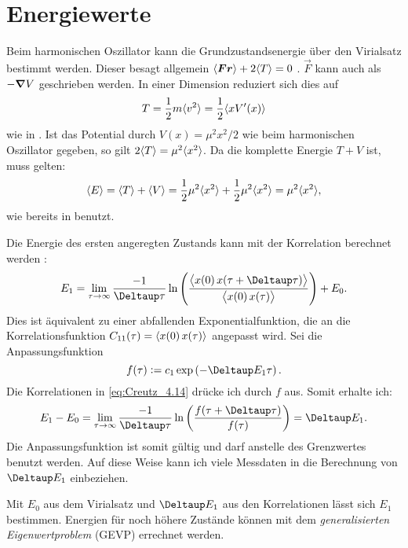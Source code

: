 \chapter{Energiewerte}

Beim harmonischen Oszillator kann die Grundzustandsenergie über den Virialsatz
bestimmt werden. Dieser besagt allgemein $\langle \boldsymbol{F} \boldsymbol{r} \rangle + 2
\langle T \rangle = 0$ \parencite[551]{Kuypers/Mechanik}. $\vec F$ kann auch als $-
\boldsymbol{\nabla} V$ geschrieben werden. In einer Dimension reduziert sich dies auf
\[
    T = \frac12 m \langle v^2 \rangle = \frac12 \langle x V'(x) \rangle
\]
wie in \parencite[(2.29)]{Creutz/Statistical_Approach_QM}.
Ist das Potential durch $V(x) = \mu^2 x^2/2$ wie beim harmonischen Oszillator
gegeben, so gilt $2 \langle T \rangle = \mu^2 \langle x^2 \rangle$. Da die komplette Energie
$T + V$ ist, muss gelten:
\[
    \langle E \rangle = \langle T \rangle + \langle V \rangle
    = \frac12 \mu^2 \langle x^2 \rangle + \frac12 \mu^2 \langle x^2 \rangle
    = \mu^2 \langle x^2 \rangle,
\]
wie bereits in \parencite[(4.13)]{Creutz/Statistical_Approach_QM} benutzt.

Die Energie des ersten angeregten Zustands kann mit der Korrelation
berechnet werden \parencite[(4.14)]{Creutz/Statistical_Approach_QM}:
\begin{equation}
    \label{eq:Creutz_4.14}
    E_1 = \lim_{\tau \to \infty} \frac{-1}{\Deltaup \tau} \ln
    \del{\frac{\Bracket{x(0) \, x(\tau + \Deltaup \tau)}}{\Bracket{x(0) \,
    x(\tau)}}} + E_0.
\end{equation}
Dies ist äquivalent zu einer abfallenden Exponentialfunktion, die an die
Korrelationsfunktion $C_{11}(\tau) = \langle x(0) \, x(\tau) \rangle$ angepasst wird.
Sei die Anpassungsfunktion
\begin{equation}
    \label{eq:fit-function-time-evolution}
    f(\tau) := c_1 \exp\del{-\Deltaup E_1 \tau}.
\end{equation}
Die Korrelationen in \eqref{eq:Creutz_4.14} drücke ich durch $f$ aus. Somit
erhalte ich:
\[
    E_1 - E_0
    = \lim_{\tau \to \infty} \frac{-1}{\Deltaup \tau} \ln
    \del{\frac{f(\tau + \Deltaup \tau)}{f(\tau)}}
    = \Deltaup E_1.
\]
Die Anpassungsfunktion ist somit gültig und darf anstelle des Grenzwertes
benutzt werden. Auf diese Weise kann ich viele Messdaten in die Berechnung von
$\Deltaup E_1$ einbeziehen.

Mit $E_0$ aus dem Virialsatz und $\Deltaup E_1$ aus den Korrelationen lässt
sich $E_1$ bestimmen. Energien für noch höhere Zustände können mit dem
\emph{generalisierten Eigenwertproblem} (GEVP) errechnet werden.


